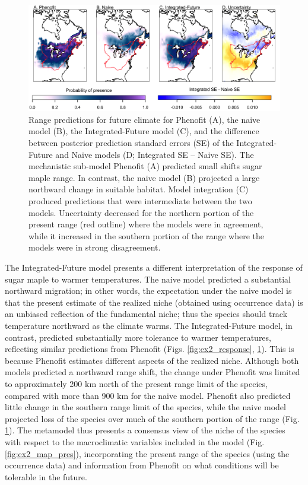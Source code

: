 \documentclass[11pt]{article}
\begin{document}
\begin{figure}[t]
\includegraphics[width=6.5in]{figs/ex2_fut_map.png}
\caption{Range predictions for future climate for Phenofit (A), the naive model (B), the Integrated-Future model (C), and the difference between posterior prediction standard errors (SE) of the Integrated-Future and Naive models (D; Integrated SE -- Naive SE).
The mechanistic sub-model Phenofit (A) predicted small shifts sugar maple range.
In contrast, the naive model (B) projected a large northward change in suitable habitat.
Model integration (C) produced predictions that were intermediate between the two models.
Uncertainty decreased for the northern portion of the present range (red outline) where the models were in agreement, while it increased in the southern portion of the range where the models were in strong disagreement.}
\label{fig:ex2_map_fut}
\end{figure}

The Integrated-Future model presents a different interpretation of the response of sugar maple to warmer temperatures. 
The naive model predicted a substantial northward migration; in other words, the expectation under the naive model is that the present estimate of the realized niche (obtained using occurrence data) is an unbiased reflection of the fundamental niche; thus the species should track temperature northward as the climate warms.
The Integrated-Future model, in contrast, predicted substantially more tolerance to warmer temperatures, reflecting similar predictions from Phenofit (Figs. \ref{fig:ex2_response}, \ref{fig:ex2_map_fut}).
This is because Phenofit estimates different aspects of the realized niche.
Although both models predicted a northward range shift, the change under Phenofit was limited to approximately 200 km north of the present range limit of the species, compared with more than 900 km for the naive model.
Phenofit also predicted little change in the southern range limit of the species, while the naive model projected loss of the species over much of the southern portion of the range (Fig. \ref{fig:ex2_map_fut}).
The metamodel thus presents a consensus view of the niche of the species with respect to the macroclimatic variables included in the model (Fig. \ref{fig:ex2_map_pres}), incorporating the present range of the species (using the occurrence data) and information from Phenofit on what conditions will be tolerable in the future.
\end{document}
